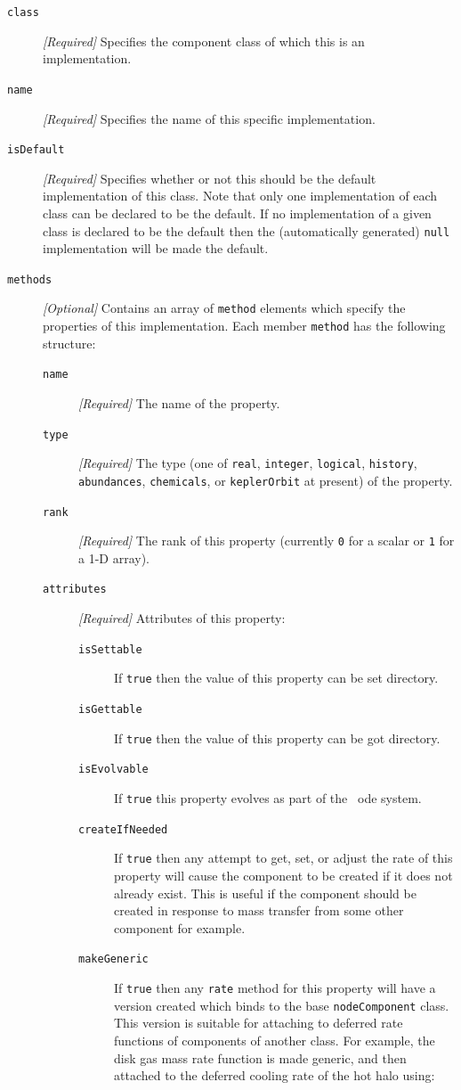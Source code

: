 \begin{description}
\item [{\tt class}] \emph{[Required]} Specifies the component class of which this is an implementation.
\item [{\tt name}] \emph{[Required]} Specifies the name of this specific implementation.
\item [{\tt isDefault}] \emph{[Required]} Specifies whether or not this should be the default implementation of this class. Note that only one implementation of each class can be declared to be the default. If no implementation of a given class is declared to be the default then the (automatically generated) {\tt null} implementation will be made the default.
\item [{\tt methods}] \emph{[Optional]} Contains an array of {\tt method} elements which specify the properties of this implementation. Each member {\tt method} has the following structure:
\begin{description}
\item [{\tt name}] \emph{[Required]} The name of the property. 
\item [{\tt type}] \emph{[Required]} The type (one of {\tt real}, {\tt integer}, {\tt logical}, {\tt history}, {\tt abundances}, {\tt chemicals}, or {\tt keplerOrbit} at present) of the property.
\item [{\tt rank}] \emph{[Required]} The rank of this property (currently {\tt 0} for a scalar or {\tt 1} for a 1-D array).
\item [{\tt attributes}] \emph{[Required]} Attributes of this property:
\begin{description}
\item [{\tt isSettable}] If {\tt true} then the value of this property can be set directory.
\item [{\tt isGettable}] If {\tt true} then the value of this property can be got directory.
\item [{\tt isEvolvable}] If {\tt true} this property evolves as part of the \glc\ \gls{ode} system.
\item [{\tt createIfNeeded}] If {\tt true} then any attempt to get, set, or adjust the rate of this property will cause the component to be created if it does not already exist. This is useful if the component should be created in response to mass transfer from some other component for example.
\item [{\tt makeGeneric}] If {\tt true} then any {\tt rate} method for this property will have a version created which binds to the base {\tt nodeComponent} class. This version is suitable for attaching to deferred rate functions of components of another class. For example, the disk gas mass rate function is made generic, and then attached to the deferred cooling rate of the hot halo using:

\end{description}
\end{description}
\end{description}
